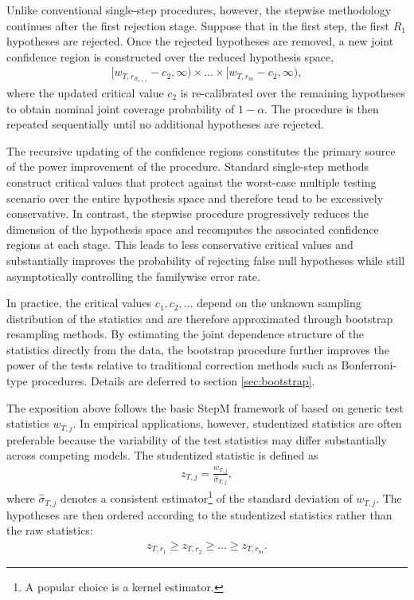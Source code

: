 \documentclass{article} %
\begin{document}
	Unlike conventional single-step procedures, however, the stepwise methodology continues after the first rejection stage. Suppose that in the first step, the first $R_1$ hypotheses are rejected. Once the rejected hypotheses are removed, a new joint confidence region is constructed over the reduced hypothesis space,
	\begin{align}
		[w_{T,r_{R_{1+1}}}-c_2,\infty)
		\times
		\dots
		\times
		[w_{T,r_m}-c_2,\infty),
	\end{align}
	where the updated critical value $c_2$ is re-calibrated over the remaining hypotheses to obtain nominal joint coverage probability of $1-\alpha$. The procedure is then repeated sequentially until no additional hypotheses are rejected.
	
	The recursive updating of the confidence regions constitutes the primary source of the power improvement of the procedure. Standard single-step methods construct critical values that protect against the worst-case multiple testing scenario over the entire hypothesis space and therefore tend to be excessively conservative. In contrast, the stepwise procedure progressively reduces the dimension of the hypothesis space and recomputes the associated confidence regions at each stage. This leads to less conservative critical values and substantially improves the probability of rejecting false null hypotheses while still asymptotically controlling the familywise error rate.
	
	In practice, the critical values $c_1,c_2,\dots$ depend on the unknown sampling distribution of the statistics and are therefore approximated through bootstrap resampling methods. By estimating the joint dependence structure of the statistics directly from the data, the bootstrap procedure further improves the power of the tests relative to traditional correction methods such as Bonferroni-type procedures. Details are deferred to section \ref{sec:bootstrap}.
	
	The exposition above follows the basic StepM framework of \textcite{ROMANOWOLF2005} based on generic test statistics $w_{T,j}$. In empirical applications, however, studentized statistics are often preferable because the variability of the test statistics may differ substantially across competing models. The studentized statistic is defined as
	\begin{align}
		z_{T,j}
		=
		\frac{w_{T,j}}{\hat{\sigma}_{T,j}},
	\end{align}
	where $\hat{\sigma}_{T,j}$ denotes a consistent estimator\footnote{A popular choice is a kernel estimator.} of the standard deviation of $w_{T,j}$. The hypotheses are then ordered according to the studentized statistics rather than the raw statistics:
	\begin{align}
		z_{T,r_1}
		\geq
		z_{T,r_2}
		\geq
		\dots
		\geq
		z_{T,r_m}.
	\end{align}
	
\end{document}
